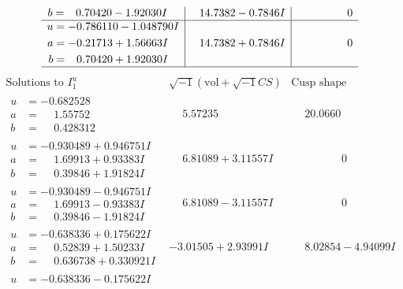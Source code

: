 \documentclass[1p]{elsarticle_modified}
\theoremstyle{definition}
\newcommand{\I}{\sqrt{-1}}
\begin{document}
$$\begin{array}{c|c|c}
\begin{aligned}
b &= \phantom{-}0.70420 - 1.92030 I\end{aligned}
 & \phantom{-}14.7382 - 0.7846 I & \phantom{-0.000000 } 0 \\ \hline\begin{aligned}
u &= -0.786110 - 1.048790 I \\
a &= -0.21713 + 1.56663 I \\
b &= \phantom{-}0.70420 + 1.92030 I\end{aligned}
 & \phantom{-}14.7382 + 0.7846 I & \phantom{-0.000000 } 0\\
 \hline 
 \end{array}$$\newpage$$\begin{array}{c|c|c}  
\text{Solutions to }I^u_{1}& \I (\text{vol} + \sqrt{-1}CS) & \text{Cusp shape}\\
 \hline 
\begin{aligned}
u &= -0.682528\phantom{ +0.000000I} \\
a &= \phantom{-}1.55752\phantom{ +0.000000I} \\
b &= \phantom{-}0.428312\phantom{ +0.000000I}\end{aligned}
 & \phantom{-}5.57235\phantom{ +0.000000I} & \phantom{-}20.0660\phantom{ +0.000000I} \\ \hline\begin{aligned}
u &= -0.930489 + 0.946751 I \\
a &= \phantom{-}1.69913 + 0.93383 I \\
b &= \phantom{-}0.39846 + 1.91824 I\end{aligned}
 & \phantom{-}6.81089 + 3.11557 I & \phantom{-0.000000 } 0 \\ \hline\begin{aligned}
u &= -0.930489 - 0.946751 I \\
a &= \phantom{-}1.69913 - 0.93383 I \\
b &= \phantom{-}0.39846 - 1.91824 I\end{aligned}
 & \phantom{-}6.81089 - 3.11557 I & \phantom{-0.000000 } 0 \\ \hline\begin{aligned}
u &= -0.638336 + 0.175622 I \\
a &= \phantom{-}0.52839 + 1.50233 I \\
b &= \phantom{-}0.636738 + 0.330921 I\end{aligned}
 & -3.01505 + 2.93991 I & \phantom{-}8.02854 - 4.94099 I \\ \hline\begin{aligned}
u &= -0.638336 - 0.175622 I \\

\end{aligned}
\end{array}$$
\end{document}
